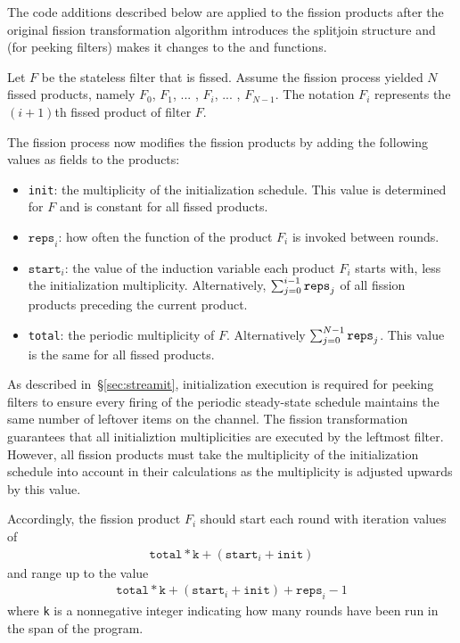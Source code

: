 The code additions described below are applied to the fission products
after the original fission transformation algorithm introduces the
splitjoin structure and (for peeking filters) makes it changes to the
\work and \prework functions.

Let $F$ be the stateless filter that is fissed. Assume the
fission process yielded $N$ fissed products, namely $F_0$, $F_1$, ... , $F_i$, ... , $F_{N-1}$. The
notation $F_{i}$ represents the $(i+1)$th fissed product of filter
$F$.

The fission process now modifies the fission products by adding the
following values as fields to the products:
\begin{itemize}
    \item \texttt{init}: the multiplicity of the initialization schedule.  This value is determined for $F$ and is constant for all fissed products.
    \item $\texttt{reps}_i$: how often the \work function of the product $F_i$ is
      invoked between rounds.
    \item $\texttt{start}_i$: the value of the induction variable each product $F_i$ starts with, less the initialization multiplicity.  Alternatively, $\sum_{j=0}^{i-1}{\tt reps}_j$ of all fission products preceding the current product.
    \item \texttt{total}: the periodic multiplicity of $F$.  Alternatively $\sum_{j=0}^{N-1}{\tt reps}_j$. This value is the same for all fissed products.
\end{itemize}
As described in~\S\ref{sec:streamit}, initialization execution is required for peeking filters to ensure every firing of the periodic steady-state schedule maintains the same number of leftover items on the channel.  The fission transformation guarantees that all initializtion multiplicities are executed by the leftmost filter.  However, all fission products must take the multiplicity of the initialization schedule into account in their calculations as the multiplicity is adjusted upwards by this value.

Accordingly, the fission product $F_i$ should start each round with iteration values of
\begin{eqnarray*}
\texttt{total}*\texttt{k} + (\texttt{start}_i + \texttt{init})
\end{eqnarray*}
and range up to the value
\begin{eqnarray*}
\texttt{total}*\texttt{k} + (\texttt{start}_i + \texttt{init}) + \texttt{reps}_i - 1
\end{eqnarray*}
where \texttt{k} is a nonnegative integer indicating how many rounds have
been run in the span of the program.  

